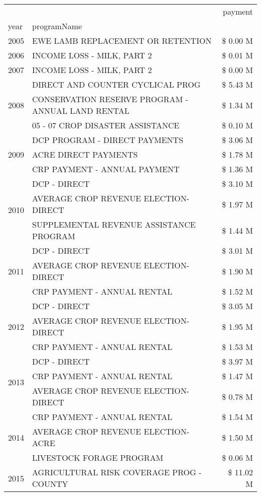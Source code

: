 \begin{tabular}{llr}
\toprule
 &  & payment \\
year & programName &  \\
\midrule
2005 & EWE LAMB REPLACEMENT OR RETENTION & \$ 0.00 M \\
\cline{1-3}
2006 & INCOME LOSS - MILK, PART 2 & \$ 0.01 M \\
\cline{1-3}
2007 & INCOME LOSS - MILK, PART 2 & \$ 0.00 M \\
\cline{1-3}
\multirow[t]{3}{*}{2008} & DIRECT AND COUNTER CYCLICAL PROG & \$ 5.43 M \\
 & CONSERVATION RESERVE PROGRAM - ANNUAL LAND RENTAL & \$ 1.34 M \\
 & 05 - 07 CROP DISASTER ASSISTANCE & \$ 0.10 M \\
\cline{1-3}
\multirow[t]{3}{*}{2009} & DCP PROGRAM - DIRECT PAYMENTS & \$ 3.06 M \\
 & ACRE DIRECT PAYMENTS & \$ 1.78 M \\
 & CRP PAYMENT - ANNUAL PAYMENT & \$ 1.36 M \\
\cline{1-3}
\multirow[t]{3}{*}{2010} & DCP - DIRECT & \$ 3.10 M \\
 & AVERAGE CROP REVENUE ELECTION-DIRECT & \$ 1.97 M \\
 & SUPPLEMENTAL REVENUE ASSISTANCE PROGRAM & \$ 1.44 M \\
\cline{1-3}
\multirow[t]{3}{*}{2011} & DCP - DIRECT & \$ 3.01 M \\
 & AVERAGE CROP REVENUE ELECTION-DIRECT & \$ 1.90 M \\
 & CRP PAYMENT - ANNUAL RENTAL & \$ 1.52 M \\
\cline{1-3}
\multirow[t]{3}{*}{2012} & DCP - DIRECT & \$ 3.05 M \\
 & AVERAGE CROP REVENUE ELECTION-DIRECT & \$ 1.95 M \\
 & CRP PAYMENT - ANNUAL RENTAL & \$ 1.53 M \\
\cline{1-3}
\multirow[t]{3}{*}{2013} & DCP - DIRECT & \$ 3.97 M \\
 & CRP PAYMENT - ANNUAL RENTAL & \$ 1.47 M \\
 & AVERAGE CROP REVENUE ELECTION-DIRECT & \$ 0.78 M \\
\cline{1-3}
\multirow[t]{3}{*}{2014} & CRP PAYMENT - ANNUAL RENTAL & \$ 1.54 M \\
 & AVERAGE CROP REVENUE ELECTION-ACRE & \$ 1.50 M \\
 & LIVESTOCK FORAGE PROGRAM & \$ 0.06 M \\
\cline{1-3}
\multirow[t]{3}{*}{2015} & AGRICULTURAL RISK COVERAGE PROG - COUNTY & \$ 11.02 M \\

\end{tabular}
